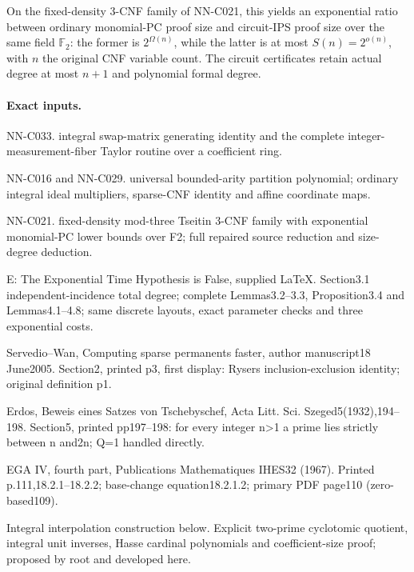 \begin{proposition}[NN-C034]
On the fixed-density 3-CNF family of NN-C021, this yields an exponential ratio between ordinary monomial-PC proof size and circuit-IPS proof size over the same field $\mathbb F_2$: the former is $2^{\Omega(n)}$, while the latter is at most $S(n)=2^{o(n)}$, with $n$ the original CNF variable count. The circuit certificates retain actual degree at most $n+1$ and polynomial formal degree.
\end{proposition}
\paragraph{Exact inputs.}
NN-C033. integral swap-matrix generating identity and the complete integer-measurement-fiber Taylor routine over a coefficient ring.

NN-C016 and NN-C029. universal bounded-arity partition polynomial; ordinary integral ideal multipliers, sparse-CNF identity and affine coordinate maps.

NN-C021. fixed-density mod-three Tseitin 3-CNF family with exponential monomial-PC lower bounds over F2; full repaired source reduction and size-degree deduction.

E: The Exponential Time Hypothesis is False, supplied LaTeX. Section3.1 independent-incidence total degree; complete Lemmas3.2--3.3, Proposition3.4 and Lemmas4.1--4.8; same discrete layouts, exact parameter checks and three exponential costs.

Servedio--Wan, Computing sparse permanents faster, author manuscript18 June2005. Section2, printed p3, first display: Rysers inclusion-exclusion identity; original definition p1.

Erdos, Beweis eines Satzes von Tschebyschef, Acta Litt. Sci. Szeged5(1932),194--198. Section5, printed pp197--198: for every integer n>1 a prime lies strictly between n and2n; Q=1 handled directly.

EGA IV, fourth part, Publications Mathematiques IHES32 (1967). Printed p.111,18.2.1--18.2.2; base-change equation18.2.1.2; primary PDF page110 (zero-based109).

Integral interpolation construction below. Explicit two-prime cyclotomic quotient, integral unit inverses, Hasse cardinal polynomials and coefficient-size proof; proposed by root and developed here.

